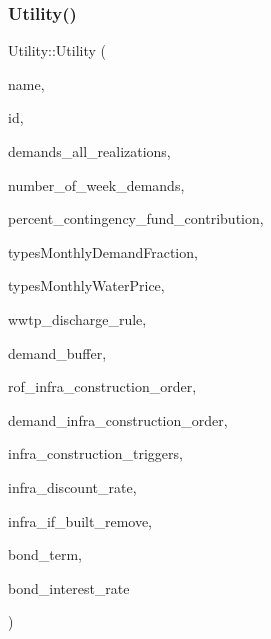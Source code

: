 \subsubsection{\texorpdfstring{Utility()}{Utility()}\hspace{0.1cm}{\footnotesize\ttfamily [2/4]}}
{\footnotesize\ttfamily Utility\+::\+Utility (\begin{DoxyParamCaption}\item[{const char $\ast$}]{name,  }\item[{int}]{id,  }\item[{vector$<$ vector$<$ double $>$$>$ \&}]{demands\+\_\+all\+\_\+realizations,  }\item[{int}]{number\+\_\+of\+\_\+week\+\_\+demands,  }\item[{const double}]{percent\+\_\+contingency\+\_\+fund\+\_\+contribution,  }\item[{const vector$<$ vector$<$ double $>$$>$ \&}]{types\+Monthly\+Demand\+Fraction,  }\item[{const vector$<$ vector$<$ double $>$$>$ \&}]{types\+Monthly\+Water\+Price,  }\item[{\mbox{\hyperlink{classWwtpDischargeRule}{Wwtp\+Discharge\+Rule}}}]{wwtp\+\_\+discharge\+\_\+rule,  }\item[{double}]{demand\+\_\+buffer,  }\item[{const vector$<$ int $>$ \&}]{rof\+\_\+infra\+\_\+construction\+\_\+order,  }\item[{const vector$<$ int $>$ \&}]{demand\+\_\+infra\+\_\+construction\+\_\+order,  }\item[{const vector$<$ double $>$ \&}]{infra\+\_\+construction\+\_\+triggers,  }\item[{double}]{infra\+\_\+discount\+\_\+rate,  }\item[{const vector$<$ vector$<$ int $>$$>$ \&}]{infra\+\_\+if\+\_\+built\+\_\+remove,  }\item[{double}]{bond\+\_\+term,  }\item[{double}]{bond\+\_\+interest\+\_\+rate }\end{DoxyParamCaption})}

